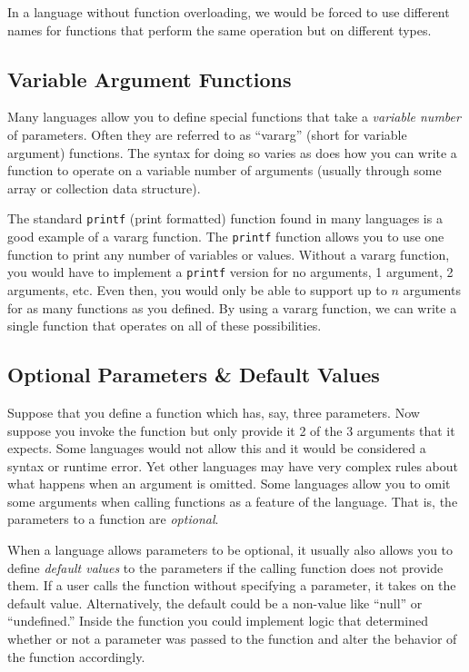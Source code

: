 In a language without function overloading, we would be forced to
use different names for functions that perform the same operation
but on different types.  

\subsection{Variable Argument Functions}

Many languages allow you to define special functions that take
a \emph{variable number} of parameters.  Often they are referred
to as ``vararg'' (short for variable argument) functions.  The syntax
for doing so varies as does how you can write a function to operate
on a variable number of arguments (usually through some array or
collection data structure).

The standard \texttt{printf} (print formatted) function found
in many languages is a good example of a vararg function.  The
\texttt{printf} function allows you to use one function to
print any number of variables or values.  Without a vararg function,
you would have to implement a \texttt{printf} version for
no arguments, 1 argument, 2 arguments, etc.  Even then, you
would only be able to support up to $n$ arguments for as many 
functions as you defined.  By using a vararg function, we can write
a single function that operates on all of these possibilities.

\subsection{Optional Parameters \& Default Values}
\label{subsection:optionalParameters}

Suppose that you define a function which has, say, three 
parameters.  Now suppose you invoke the function but only
provide it 2 of the 3 arguments that it expects.  Some languages
would not allow this and it would be considered a syntax or
runtime error.  Yet other languages may have very complex 
rules about what happens when an argument is omitted.  Some
languages allow you to omit some arguments when calling functions
as a feature of the language.  That is, the parameters to a function
are \emph{optional}.  

When a language allows parameters to be optional, it usually also
allows you to define \emph{default values} to the parameters if
the calling function does not provide them.   If a user calls the
function without specifying a parameter, it takes on the default
value.  Alternatively, the default could be a non-value like ``null''
or ``undefined.''  Inside the function you could implement logic that 
determined whether or not a parameter was passed to the function
and alter the behavior of the function accordingly.  

